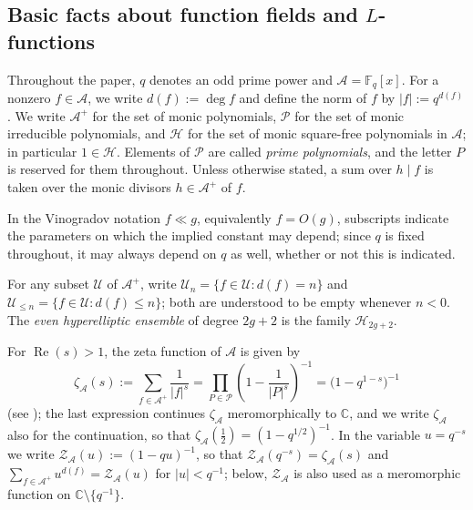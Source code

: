 \documentclass[a4paper,reqno]{amsart}
\numberwithin{equation}{section}
\theoremstyle{remark}
\theoremstyle{definition}
\newcommand{\A}{\mathcal{A}}
\begin{document}
\subsection{Basic facts about function fields and \texorpdfstring{$L$}{L}-functions}\label{sec:ff}

Throughout the paper, $q$ denotes an odd prime power and $\A=\mathbb F_q[x]$.
For a nonzero $f\in\A$, we write $d(f):=\deg f$ and define the norm of $f$ by $|f|:=q^{d(f)}$.
We write $\A^+$ for the set of monic polynomials, $\mathcal P$ for
the set of monic irreducible polynomials, and $\mathcal H$ for the
set of monic square-free polynomials in $\A$; in particular
$1\in\mathcal H$.
Elements of $\mathcal P$ are called \emph{prime polynomials}, and the
letter $P$ is reserved for them throughout.
Unless otherwise stated, a sum over $h\mid f$ is taken over the monic
divisors $h\in\A^+$ of $f$.

In the Vinogradov notation $f\ll g$, equivalently $f=O(g)$, subscripts
indicate the parameters on which the implied constant may depend; since $q$
is fixed throughout, it may always depend on $q$ as well, whether or not
this is indicated.

For any subset $\mathcal{U}$ of $\A^{+}$, write $\mathcal{U}_{n} = \{f \in \mathcal{U} : d(f) = n\}$
and $\mathcal{U}_{\le n} = \{f \in \mathcal{U} : d(f) \le n\}$; both are
understood to be empty whenever $n<0$.
The \emph{even hyperelliptic ensemble} of degree $2g+2$ is the
family $\mathcal H_{2g+2}$.

For $\operatorname{Re}(s)>1$, the zeta function of $\A$ is given by
$$
\zeta_{\A}(s):=\sum_{f\in\A^+}\frac{1}{|f|^{s}}
=\prod_{P\in\mathcal P}\left(1-\frac{1}{|P|^{s}}\right)^{-1}
=\bigl(1-q^{1-s}\bigr)^{-1}
$$
(see \cite[Chapter~2]{Ro02}); the last expression continues $\zeta_\A$
meromorphically to $\mathbb C$, and we write $\zeta_\A$ also for the
continuation, so that $\zeta_\A(\tfrac12)=(1-q^{1/2})^{-1}$. In the variable
$u=q^{-s}$ we write $\mathcal Z_{\A}(u):=(1-qu)^{-1}$, so that
$\mathcal Z_{\A}(q^{-s})=\zeta_{\A}(s)$ and
$\sum_{f\in\A^+}u^{d(f)}=\mathcal Z_\A(u)$ for $|u|<q^{-1}$; below,
$\mathcal Z_\A$ is also used as a meromorphic function on
$\mathbb C\setminus\{q^{-1}\}$.
\end{document}
